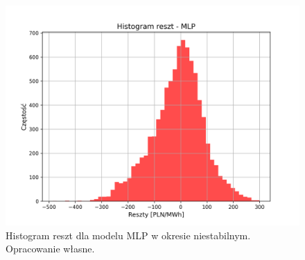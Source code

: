 \begin{figure}[H]
    \centering
    \includegraphics[width=1.0\textwidth]{../../plots/mlp2/mlp_errors_histogram_short_unstable_(64, 64, 32, 16, 8).png}
    \caption{Histogram reszt dla modelu MLP w okresie niestabilnym. Opracowanie własne.}
    \label{fig:mlp_residuals_non_stable_period}
\end{figure}
